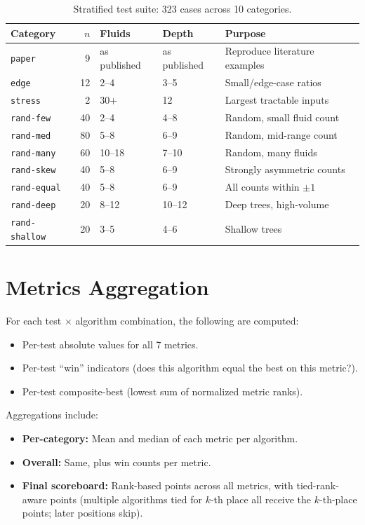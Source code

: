 \begin{table}[H]
\centering
\caption{Stratified test suite: 323 cases across 10 categories.}
\label{tab:test_suite}
\begin{tabular}{|l|r|l|l|p{5.5cm}|}
\hline
\textbf{Category} & \textbf{$n$} & \textbf{Fluids} & \textbf{Depth} & \textbf{Purpose} \\
\hline
\texttt{paper} & 9 & as published & as published & Reproduce literature examples \\
\hline
\texttt{edge} & 12 & 2--4 & 3--5 & Small/edge-case ratios \\
\hline
\texttt{stress} & 2 & 30+ & 12 & Largest tractable inputs \\
\hline
\texttt{rand-few} & 40 & 2--4 & 4--8 & Random, small fluid count \\
\hline
\texttt{rand-med} & 80 & 5--8 & 6--9 & Random, mid-range count \\
\hline
\texttt{rand-many} & 60 & 10--18 & 7--10 & Random, many fluids \\
\hline
\texttt{rand-skew} & 40 & 5--8 & 6--9 & Strongly asymmetric counts \\
\hline
\texttt{rand-equal} & 40 & 5--8 & 6--9 & All counts within $\pm 1$ \\
\hline
\texttt{rand-deep} & 20 & 8--12 & 10--12 & Deep trees, high-volume \\
\hline
\texttt{rand-shallow} & 20 & 3--5 & 4--6 & Shallow trees \\
\hline
\end{tabular}
\end{table}

\section{Metrics Aggregation}

For each test $\times$ algorithm combination, the following are computed:

\begin{itemize}
    \item Per-test absolute values for all 7 metrics.
    \item Per-test ``win'' indicators (does this algorithm equal the best on this metric?).
    \item Per-test composite-best (lowest sum of normalized metric ranks).
\end{itemize}

Aggregations include:

\begin{itemize}
    \item \textbf{Per-category:} Mean and median of each metric per algorithm.
    \item \textbf{Overall:} Same, plus win counts per metric.
    \item \textbf{Final scoreboard:} Rank-based points across all metrics, with tied-rank-aware points (multiple algorithms tied for $k$-th place all receive the $k$-th-place points; later positions skip).
\end{itemize}

